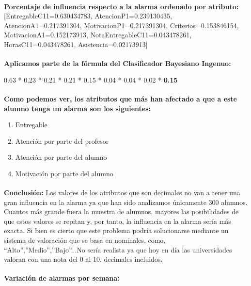 \paragraph{}
\textbf{Porcentaje de influencia respecto a la alarma ordenado por
  atributo:} [EntregableC11=0.630434783, AtencionP1=0.239130435,
  AtencionA1=0.217391304, MotivacionP1=0.217391304,
  Criterios=0.153846154, MotivacionA1=0.152173913,
  NotaEntregableC11=0.043478261, HorasC11=0.043478261,
  Asistencia=0.02173913]

\paragraph{}
\textbf{Aplicamos parte de la fórmula del Clasificador Bayesiano
  Ingenuo:}

	0.63 * 0.23 * 0.21 * 0.21 * 0.15 * 0.04 * 0.04 * 0.02 *
        \textbf{0.15}

\paragraph{}
\textbf{Como podemos ver, los atributos que más han afectado a que a
  este alumno tenga un alarma son los siguientes:}
\begin{enumerate}
\item Entregable
\item Atención por parte del profesor
\item Atención por parte del alumno
\item Motivación por parte del alumno
\end{enumerate}

\paragraph{}
\textbf{Conclusión:} Los valores de los atributos que son decimales no
van a tener una gran influencia en la alarma ya que han sido
analizamos únicamente 300 alumnos. Cuantos más grande fuera la muestra
de alumnos, mayores las posibilidades de que estos valores se repitan
y, por tanto, la influencia en la alarma sería más exacta. Si bien es
cierto que este problema podría solucionarse mediante un sistema de
valoración que se basa en nominales, como, “Alto”,”Medio”,”Bajo”...No
sería realista ya que hoy en día las universidades valoran con una
nota del 0 al 10, decimales incluidos.

\paragraph{}
\textbf{Variación de alarmas por semana:}
